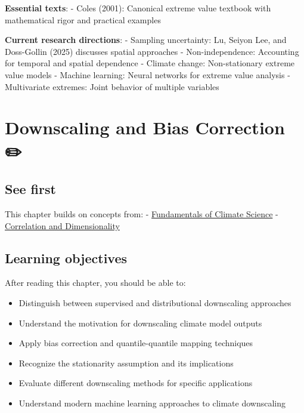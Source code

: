 \documentclass[
  letterpaper,
  DIV=11,
  numbers=noendperiod]{scrreprt}
\providecommand{\tightlist}{%
  \setlength{\itemsep}{0pt}\setlength{\parskip}{0pt}}
\begin{document}

\textbf{Essential texts}: - Coles (2001): Canonical extreme value
textbook with mathematical rigor and practical examples

\textbf{Current research directions}: - Sampling uncertainty: Lu, Seiyon
Lee, and Doss-Gollin (2025) discusses spatial approaches -
Non-independence: Accounting for temporal and spatial dependence -
Climate change: Non-stationary extreme value models - Machine learning:
Neural networks for extreme value analysis - Multivariate extremes:
Joint behavior of multiple variables

\chapter{Downscaling and Bias Correction
✏️}\label{downscaling-and-bias-correction}

\section*{See first}\label{see-first-6}


This chapter builds on concepts from: -
\href{./chapters/fundamentals/climate-science.qmd}{Fundamentals of
Climate Science} -
\href{./chapters/fundamentals/correlation-dimensionality.qmd}{Correlation
and Dimensionality}

\section*{Learning objectives}\label{learning-objectives-8}


After reading this chapter, you should be able to:

\begin{itemize}
\tightlist
\item
  Distinguish between supervised and distributional downscaling
  approaches
\item
  Understand the motivation for downscaling climate model outputs
\item
  Apply bias correction and quantile-quantile mapping techniques
\item
  Recognize the stationarity assumption and its implications
\item
  Evaluate different downscaling methods for specific applications
\item
  Understand modern machine learning approaches to climate downscaling
\end{itemize}
\end{document}
